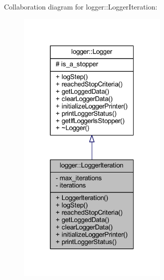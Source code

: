 Collaboration diagram for logger\+:\+:Logger\+Iteration\+:
\nopagebreak
\begin{figure}[H]
\begin{center}
\leavevmode
\includegraphics[width=205pt]{classlogger_1_1_logger_iteration__coll__graph}
\end{center}
\end{figure}
